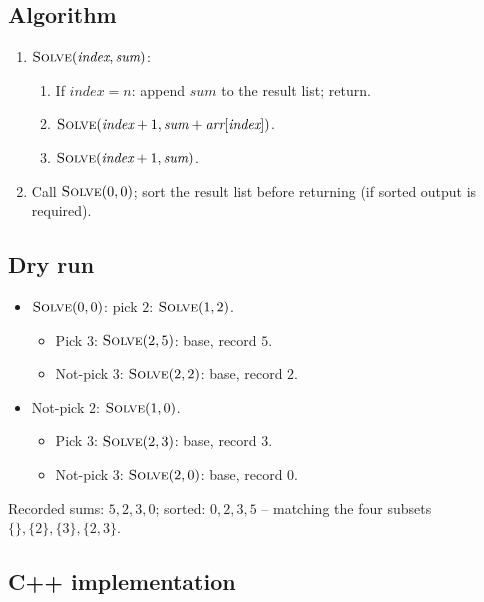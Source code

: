 \subsection*{Algorithm}

\begin{enumerate}
  \item $\textsc{Solve}(\textit{index}, \textit{sum})$:
  \begin{enumerate}
    \item If $\textit{index}=n$: append $\textit{sum}$ to the result
          list; return.
    \item $\textsc{Solve}(\textit{index}+1, \textit{sum} +
          \textit{arr}[\textit{index}])$.
    \item $\textsc{Solve}(\textit{index}+1, \textit{sum})$.
  \end{enumerate}
  \item Call $\textsc{Solve}(0,0)$; sort the result list before
        returning (if sorted output is required).
\end{enumerate}

\subsection*{Dry run}


\begin{itemize}
  \item $\textsc{Solve}(0,0)$: pick $2$: $\textsc{Solve}(1,2)$.
  \begin{itemize}
    \item Pick $3$: $\textsc{Solve}(2,5)$: base, record $5$.
    \item Not-pick $3$: $\textsc{Solve}(2,2)$: base, record $2$.
  \end{itemize}
  \item Not-pick $2$: $\textsc{Solve}(1,0)$.
  \begin{itemize}
    \item Pick $3$: $\textsc{Solve}(2,3)$: base, record $3$.
    \item Not-pick $3$: $\textsc{Solve}(2,0)$: base, record $0$.
  \end{itemize}
\end{itemize}

Recorded sums: $5,2,3,0$; sorted: $0,2,3,5$ -- matching the four subsets
$\{\}, \{2\}, \{3\}, \{2,3\}$.

\subsection*{C++ implementation}

